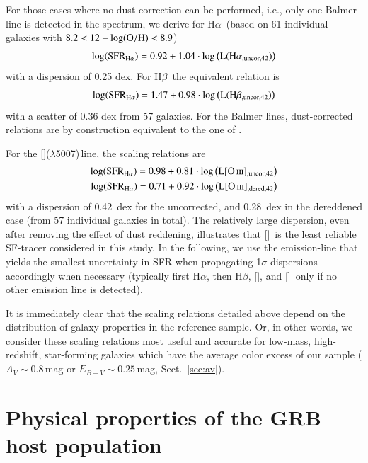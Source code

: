 \documentclass[traditabstract, longauth]{aa}
\newcommand{\hb}{H$\beta$}
\newcommand{\ha}{H$\alpha$}
\newcommand{\oh}{12+\log(\rm{O/H})}
\newcommand{\oii}{[\ion{O}{ii}]}
\newcommand{\oiii}{[\ion{O}{iii}]}
\begin{document}
For those cases where no dust correction can be performed, i.e., only one Balmer line is detected in the spectrum, we derive for \ha\, (based on 61 individual galaxies with $8.2 < \oh < 8.9$)
\begin{equation}
\log(\rm{SFR_{H\alpha}}) = 0.92 + 1.04\cdot\log\left(L({\rm{H}\alpha_{\rm{,uncor,42}}})\right)
\end{equation}
with a dispersion of 0.25 dex. For \hb\, the equivalent relation is
\begin{equation}
\log(\rm{SFR_{H\alpha}}) = 1.47 + 0.98\cdot\log\left(L({\rm{H}\beta_{\rm{,uncor,42}}})\right)
\end{equation}
with a scatter of 0.36 dex from 57 galaxies. For the Balmer lines, dust-corrected relations are by construction equivalent to the one of \citet{1998ARA&A..36..189K}.

For the \oiii($\lambda$5007)\,line, the scaling relations are
\begin{equation}
\begin{split}
\log(\rm{SFR_{H\alpha}}) = 0.98 + 0.81\cdot\log\left(L{\oiii_{\rm{,uncor,42}}}\right)\\
\log(\rm{SFR_{H\alpha}}) = 0.71 + 0.92\cdot\log\left(L{\oiii_{\rm{,dered,42}}}\right)
\end{split}
\end{equation}
with a dispersion of 0.42~dex for the uncorrected, and 0.28~dex in the dereddened case (from 57 individual galaxies in total).  {The relatively large dispersion, even after removing the effect of dust reddening, illustrates that \oiii\, is the least reliable SF-tracer considered in this study.} In the following, we use the emission-line that yields the smallest uncertainty in SFR when propagating 1$\sigma$ dispersions accordingly when necessary (typically first \ha, then \hb, \oii, and \oiii\, only if no other emission line is detected).

It is immediately clear that the scaling relations detailed above depend on the distribution of galaxy properties in the reference sample. Or, in other words, we consider these scaling relations most useful and accurate for low-mass, high-redshift, star-forming galaxies which have the average color excess of our sample ($A_V\sim0.8$\,mag or $E_{B-V}\sim0.25$\,mag, Sect.~\ref{sec:av}).

\section{Physical properties of the GRB host population}
\label{sec:prop}
\end{document}
